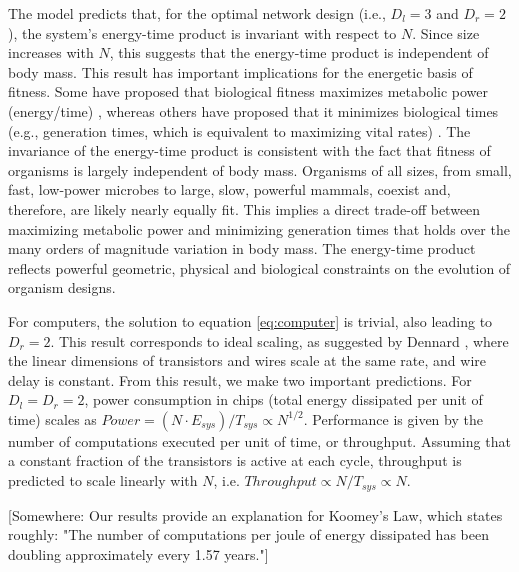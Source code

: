 \documentclass[12pt]{article}
\begin{document}
The model predicts that, for the optimal network design (i.e., $D_l=3$  
and $D_r=2$), the system's energy-time product is invariant with 
respect to $N$.  Since size increases with $N$, this suggests that the 
energy-time product is independent of body mass.   This result has 
important implications for the energetic basis of fitness.  Some have 
proposed that biological fitness maximizes metabolic power 
(energy/time) \cite{lotka56, odum71}, whereas others have proposed 
that it minimizes biological times (e.g., generation times, which is 
equivalent to maximizing vital rates) \cite{lindstedt81, sibly91}. The 
invariance of the energy-time product is consistent with the fact that 
fitness of organisms is largely independent of body mass.  Organisms 
of all sizes, from small, fast, low-power microbes to large, slow, 
powerful mammals, coexist and, therefore, are likely nearly equally 
fit.  This implies a direct trade-off between maximizing metabolic 
power and minimizing generation times that holds over the many orders 
of magnitude variation in body mass.  The energy-time product reflects 
powerful geometric, physical and biological constraints on the 
evolution of organism designs.

For computers, the solution to equation \ref{eq:computer} is trivial, 
also leading to $D_r=2$.  This result corresponds to ideal scaling, as 
suggested by Dennard \cite{dennard74}, where the linear dimensions of 
transistors and wires scale at the same rate, and wire delay is 
constant.  From this result, we make two important predictions. For 
$D_l=D_r=2$, power consumption in chips (total energy dissipated per 
unit of time) scales as $Power = (N\cdot E_{sys})/T_{sys} \propto 
N^{1/2}$.  Performance is given by the  number of computations 
executed per unit of time, or throughput.  Assuming that a constant 
fraction of the transistors is active at each cycle, throughput is 
predicted to scale linearly with $N$,  i.e.  $Throughput\propto 
N/T_{sys} \propto N$.

[Somewhere: Our results provide an explanation for Koomey's Law, which states roughly: "The number of computations per joule of energy dissipated has been doubling approximately every 1.57 years."]
\end{document}
